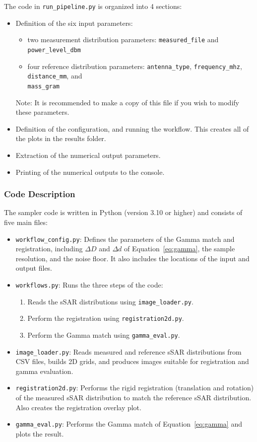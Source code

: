 \documentclass{./class/itisreport}
\begin{document}
The code in \verb|run_pipeline.py| is organized into 4 sections: 
\begin{itemize}
    \item Definition of the six input parameters: 
    \begin{itemize}
        \item two measurement distribution parameters: \verb|measured_file| and \verb|power_level_dbm|
        \item four reference distribution parameters: \verb|antenna_type|, \verb|frequency_mhz|, \verb|distance_mm|, and\\ \verb|mass_gram|
    \end{itemize}
    Note: It is recommended to make a copy of this file if you wish to modify these parameters.
    \item Definition of the configuration, and running the workflow. This creates all of the plots in the results folder.
    \item Extraction of the numerical output parameters.
    \item Printing of the numerical outputs to the console.
\end{itemize}

\FloatBarrier
\subsubsection{Code Description}\label{sec:description}

The sampler code is written in Python (version 3.10 or higher) and consists of five main files:

\begin{itemize}
\item \verb|workflow_config.py|: Defines the parameters of the Gamma match and registration, including $\Delta D$ and $\Delta d$ of Equation~\ref{eq:gamma}, the sample resolution, and the noise floor. It also includes the locations of the input and output files.
\item \verb|workflows.py|: Runs the three steps of the code:
    \begin{enumerate}
    \item Reads the sSAR distributions using \verb|image_loader.py|.
    \item Perform the registration using \verb|registration2d.py|.
    \item Perform the Gamma match using \verb|gamma_eval.py|.
    \end{enumerate}
\item \verb|image_loader.py|: Reads measured and reference sSAR distributions from CSV files, builds 2D grids, and produces images suitable for registration and gamma evaluation.
\item \verb|registration2d.py|: Performs the rigid registration (translation and rotation) of the measured sSAR distribution to match the reference sSAR distribution. Also creates the registration overlay plot.
\item \verb|gamma_eval.py|: Performs the Gamma match of Equation~\ref{eq:gamma} and plots the result.
\end{itemize}
\end{document}
